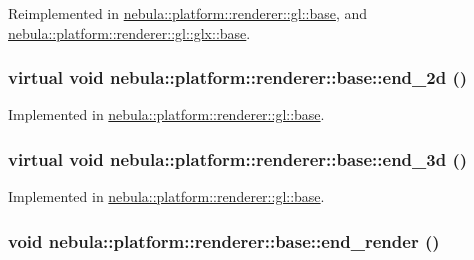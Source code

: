 Reimplemented in \hyperlink{classnebula_1_1platform_1_1renderer_1_1gl_1_1base_abd5831cdc84edc5bece8a23296acba2b}{nebula::platform::renderer::gl::base}, and \hyperlink{classnebula_1_1platform_1_1renderer_1_1gl_1_1glx_1_1base_a969f44b3066064468c15596562c18e00}{nebula::platform::renderer::gl::glx::base}.\hypertarget{classnebula_1_1platform_1_1renderer_1_1base_a5e365d3edf9b4196d101e265a52a7157}{
\subsubsection[{end\_\-2d}]{\setlength{\rightskip}{0pt plus 5cm}virtual void nebula::platform::renderer::base::end\_\-2d ()}}
\label{classnebula_1_1platform_1_1renderer_1_1base_a5e365d3edf9b4196d101e265a52a7157}


Implemented in \hyperlink{classnebula_1_1platform_1_1renderer_1_1gl_1_1base_ac543d418a1acc58a178e96f552af1aca}{nebula::platform::renderer::gl::base}.\hypertarget{classnebula_1_1platform_1_1renderer_1_1base_a0029bf3d8dca641962a7f54cbc0d8a35}{
\subsubsection[{end\_\-3d}]{\setlength{\rightskip}{0pt plus 5cm}virtual void nebula::platform::renderer::base::end\_\-3d ()}}
\label{classnebula_1_1platform_1_1renderer_1_1base_a0029bf3d8dca641962a7f54cbc0d8a35}


Implemented in \hyperlink{classnebula_1_1platform_1_1renderer_1_1gl_1_1base_a6433b19464dae4b08fcfd20ca1ca8731}{nebula::platform::renderer::gl::base}.\hypertarget{classnebula_1_1platform_1_1renderer_1_1base_aa3caace8ed843895f841504742150d7a}{
\subsubsection[{end\_\-render}]{\setlength{\rightskip}{0pt plus 5cm}void nebula::platform::renderer::base::end\_\-render ()}}
\label{classnebula_1_1platform_1_1renderer_1_1base_aa3caace8ed843895f841504742150d7a}


